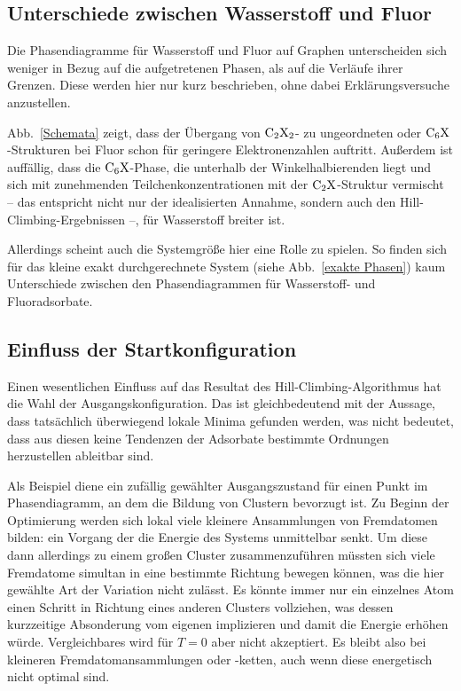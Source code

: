\documentclass[a4paper, 10pt, twoside, openany]{book} %
\begin{document}
	\subsection{Unterschiede zwischen Wasserstoff und Fluor}
	
	Die Phasendiagramme für Wasserstoff und Fluor auf Graphen unterscheiden sich weniger in Bezug auf die aufgetretenen Phasen, als auf die Verläufe ihrer Grenzen. Diese werden hier nur kurz beschrieben, ohne dabei Erklärungsversuche anzustellen.
	
	Abb.~\ref{Schemata} zeigt, dass der Übergang von $\rm C_2X_2$- zu ungeordneten oder $\rm C_6X$-Strukturen bei Fluor schon für geringere Elektronenzahlen auftritt. Außerdem ist auffällig, dass die $\rm C_6X$-Phase, die unterhalb der Winkelhalbierenden liegt und sich mit zunehmenden Teilchenkonzentrationen mit der $\rm C_2X$-Struktur vermischt -- das entspricht nicht nur der idealisierten Annahme, sondern auch den Hill-Climbing-Ergebnissen --, für Wasserstoff breiter ist.
	
	Allerdings scheint auch die Systemgröße hier eine Rolle zu spielen. So finden sich für das kleine exakt durchgerechnete System (siehe Abb.~\ref{exakte Phasen}) kaum Unterschiede zwischen den Phasendiagrammen für Wasserstoff- und Fluoradsorbate.
	
	\subsection{Einfluss der Startkonfiguration}
	\label{Startkonfiguration}
	
	Einen wesentlichen Einfluss auf das Resultat des Hill-Climbing-Algorithmus hat die Wahl der Ausgangskonfiguration. Das ist gleichbedeutend mit der Aussage, dass tatsächlich überwiegend lokale Minima gefunden werden, was nicht bedeutet, dass aus diesen keine Tendenzen der Adsorbate bestimmte Ordnungen herzustellen ableitbar sind.
	
	Als Beispiel diene ein zufällig gewählter Ausgangszustand für einen Punkt im Phasendiagramm, an dem die Bildung von Clustern bevorzugt ist. Zu Beginn der Optimierung werden sich lokal viele kleinere Ansammlungen von Fremdatomen bilden: ein Vorgang der die Energie des Systems unmittelbar senkt. Um diese dann allerdings zu einem großen Cluster zusammenzuführen müssten sich viele Fremdatome simultan in eine bestimmte Richtung bewegen können, was die hier gewählte Art der Variation nicht zulässt. Es könnte immer nur ein einzelnes Atom einen Schritt in Richtung eines anderen Clusters vollziehen, was dessen kurzzeitige Absonderung vom eigenen implizieren und damit die Energie erhöhen würde. Vergleichbares wird für $T = 0$ aber nicht akzeptiert. Es bleibt also bei kleineren Fremdatomansammlungen oder -ketten, auch wenn diese energetisch nicht optimal sind.
	
\end{document}
